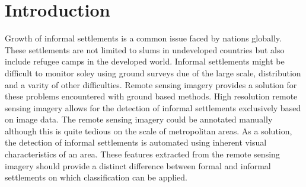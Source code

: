 \section{Introduction}

Growth of informal settlements is a common issue faced by nations globally.
These settlements are not limited to slums in undeveloped countries but also
include refugee camps in the developed world. Informal settlements might be
difficult to monitor soley using ground surveys due of the large scale,
distribution and a varity of other difficulties. Remote sensing imagery
provides a solution for these problems encountered with ground based methods.
High resolution remote sensing imagery allows for the detection of informal
settlements exclusively based on image data.
The remote sensing imagery could be annotated manually although this is quite
tedious on the scale of metropolitan areas. As a solution, the detection of informal
settlements is automated using inherent visual characteristics of an area. These features extracted from the remote sensing
imagery should provide a distinct difference between formal and informal
settlements on which classification can be applied. 
